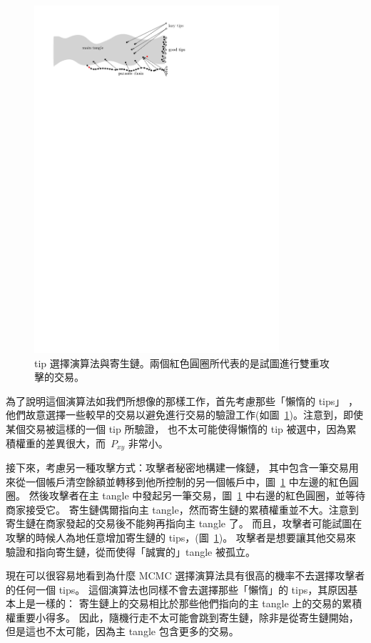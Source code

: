 \documentclass[12pt]{article}
\begin{document}
\begin{CJK}{UTF8}{bkai}
\begin{figure}
 \centering \includegraphics[width=0.81\textwidth]{tip_Markov} 
\caption{tip 選擇演算法與寄生鏈。兩個紅色圓圈所代表的是試圖進行雙重攻擊的交易。}
\label{f_tip_Markov}
\end{figure}

為了說明這個演算法如我們所想像的那樣工作，首先考慮那些「懶惰的 tips」
，他們故意選擇一些較早的交易以避免進行交易的驗證工作(如圖~\ref{f_tip_Markov})。注意到，即使某個交易被這樣的一個 tip 所驗證，
也不太可能使得懶惰的 tip 被選中，因為累積權重的差異很大，而~$P_{xy}$ 非常小。

接下來，考慮另一種攻擊方式：攻擊者秘密地構建一條鏈，
其中包含一筆交易用來從一個帳戶清空餘額並轉移到他所控制的另一個帳戶中，圖~\ref{f_tip_Markov} 中左邊的紅色圓圈。
然後攻擊者在主 tangle 中發起另一筆交易，圖~\ref{f_tip_Markov} 中右邊的紅色圓圈，並等待商家接受它。
寄生鏈偶爾指向主 tangle，然而寄生鏈的累積權重並不大。注意到寄生鏈在商家發起的交易後不能夠再指向主 tangle 了。
而且，攻擊者可能試圖在攻擊的時候人為地任意增加寄生鏈的 tips，(圖~\ref{f_tip_Markov})。
攻擊者是想要讓其他交易來驗證和指向寄生鏈，從而使得「誠實的」tangle 被孤立。

現在可以很容易地看到為什麼 MCMC 選擇演算法具有很高的機率不去選擇攻擊者的任何一個 tips。
這個演算法也同樣不會去選擇那些「懶惰」的 tips，其原因基本上是一樣的：
寄生鏈上的交易相比於那些他們指向的主 tangle 上的交易的累積權重要小得多。
因此，隨機行走不太可能會跳到寄生鏈，除非是從寄生鏈開始，但是這也不太可能，因為主 tangle 包含更多的交易。
 

\end{CJK}
\end{document}
